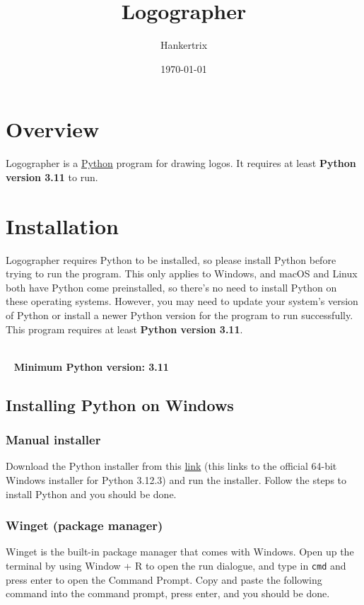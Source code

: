 \documentclass[11pt]{article}
\author{Hankertrix}
\date{\today}
\title{Logographer}
\begin{document}
\maketitle
\setcounter{tocdepth}{2}
\tableofcontents \clearpage
\section{Overview}
\label{sec:org94e2f15}
Logographer is a \href{https://www.python.org/}{Python} program for drawing logos. It requires at least \textbf{Python version 3.11} to run.

\section{Installation}
\label{sec:orge27ff45}
Logographer requires Python to be installed, so please install Python before trying to run the program. This only applies to Windows, and macOS and Linux both have Python come preinstalled, so there's no need to install Python on these operating systems. However, you may need to update your system's version of Python or install a newer Python version for the program to run successfully. This program requires at least \textbf{Python version 3.11}.

 ~\\~  \textbf{Minimum Python version: 3.11}

\subsection{Installing Python on Windows}
\label{sec:org2c739c7}

\subsubsection{Manual installer}
\label{sec:org58142ca}
Download the Python installer from this \href{https://www.python.org/ftp/python/3.12.3/python-3.12.3-amd64.exe}{link} (this links to the official 64-bit Windows installer for Python 3.12.3) and run the installer. Follow the steps to install Python and you should be done.

\subsubsection{Winget (package manager)}
\label{sec:org99e8c4e}
Winget is the built-in package manager that comes with Windows. Open up the terminal by using Window + R to open the run dialogue, and type in \texttt{cmd} and press enter to open the Command Prompt. Copy and paste the following command into the command prompt, press enter, and you should be done.
\end{document}
